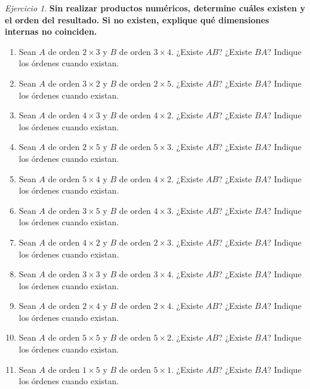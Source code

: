 \documentclass[12pt]{article}
\theoremstyle{remark}
\newtheorem{Ejer}[definicion]{Ejercicio}
\begin{document}
\begin{Ejer}

\textbf{Sin realizar productos numéricos, determine cuáles existen y el orden del resultado. Si no existen, explique qué dimensiones internas no coinciden.}
\begin{enumerate}[resume=banco]

\item Sean $A$ de orden $2\times3$ y $B$ de orden $3\times4$. ¿Existe $AB$? ¿Existe $BA$? Indique los órdenes cuando existan.

\item Sean $A$ de orden $3\times2$ y $B$ de orden $2\times5$. ¿Existe $AB$? ¿Existe $BA$? Indique los órdenes cuando existan.

\item Sean $A$ de orden $4\times3$ y $B$ de orden $4\times2$. ¿Existe $AB$? ¿Existe $BA$? Indique los órdenes cuando existan.

\item Sean $A$ de orden $2\times5$ y $B$ de orden $5\times3$. ¿Existe $AB$? ¿Existe $BA$? Indique los órdenes cuando existan.

\item Sean $A$ de orden $5\times4$ y $B$ de orden $4\times2$. ¿Existe $AB$? ¿Existe $BA$? Indique los órdenes cuando existan.

\item Sean $A$ de orden $3\times5$ y $B$ de orden $4\times3$. ¿Existe $AB$? ¿Existe $BA$? Indique los órdenes cuando existan.

\item Sean $A$ de orden $4\times2$ y $B$ de orden $2\times3$. ¿Existe $AB$? ¿Existe $BA$? Indique los órdenes cuando existan.

\item Sean $A$ de orden $3\times3$ y $B$ de orden $3\times4$. ¿Existe $AB$? ¿Existe $BA$? Indique los órdenes cuando existan.

\item Sean $A$ de orden $2\times4$ y $B$ de orden $2\times4$. ¿Existe $AB$? ¿Existe $BA$? Indique los órdenes cuando existan.

\item Sean $A$ de orden $5\times5$ y $B$ de orden $5\times2$. ¿Existe $AB$? ¿Existe $BA$? Indique los órdenes cuando existan.

\item Sean $A$ de orden $1\times5$ y $B$ de orden $5\times1$. ¿Existe $AB$? ¿Existe $BA$? Indique los órdenes cuando existan.


\end{enumerate}
\end{Ejer}
\end{document}
